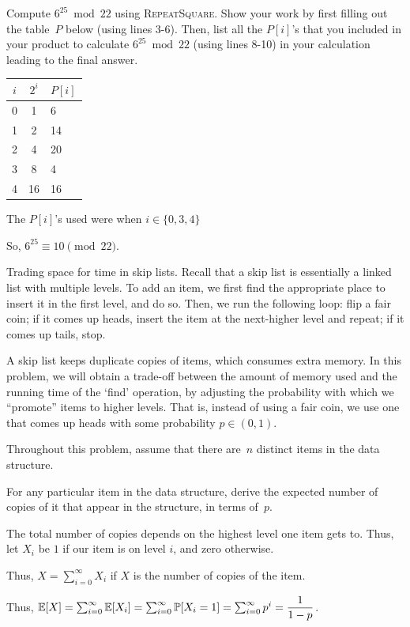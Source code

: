 \documentclass[12pt, letterpaper]{article}
\renewcommand{\P}{\mathbb{P}}
\begin{document}
\begin{subproblem}{}
    Compute $6^{25} \bmod 22$ using \textsc{RepeatSquare}. Show your work by first filling out the table~$P$ below (using lines 3-6). Then, list all the $P[i]$'s that you included in your product to calculate $6^{25} \bmod 22$ (using lines 8-10) in your calculation leading to the final answer. 
\end{subproblem}
\begin{problemproof}
    \begin{table}[H]\centering
        \begin{tabular}{c|c|l}
        $i$ & $2^i$ & $P[i]$ \\
        \hline
         0  & 1 & 6 \\
         1  & 2 & 14 \\
         2  & 4 & 20 \\
         3  & 8 & 4 \\
         4  & 16 & 16 \\
        \end{tabular}
        \end{table}
        The $P[i]$'s used were when $i \in \{0,3,4\}$

        So, $6^{25} \equiv 10 \pmod{22}$.
\end{problemproof}

\begin{problem}{Trading space for time in skip lists.}
    Recall that a skip list is essentially a linked list with multiple levels.
  To add an item, we first find the appropriate place to insert it in the first level, and do so.
  Then, we run the following loop: flip a fair coin; if it comes up heads, insert the item at the next-higher level and repeat; if it comes up tails, stop.

  A skip list keeps duplicate copies of items, which consumes extra memory.
  In this problem, we will obtain a trade-off between the amount of memory used and the running time of the `find' operation, by adjusting the probability with which we ``promote'' items to higher levels.
  That is, instead of using a fair coin, we use one that comes up heads with some probability $p \in (0,1)$.

  Throughout this problem, assume that there are~$n$ distinct items in the data structure.
\end{problem}

\begin{subproblem}{}
    For any particular item in the data structure, derive the expected number of copies of it that appear in the structure, in terms of~$p$.
\end{subproblem}
\begin{problemproof}
    The total number of copies depends on the highest level one item gets to. Thus, let $X_i$ be $1$ if our item is on level $i$, and zero otherwise.

    Thus, $X=\sum_{i=0}^\infty X_i$ if $X$ is the number of copies of the item.

    Thus, $\E[X]=\sum_{i=0}^\infty \E[X_i]= \sum_{i=0}^\infty \P[X_i=1] = \sum_{i=0}^\infty p^i= \dfrac{1}{1-p}$.
\end{problemproof}
\end{document}
